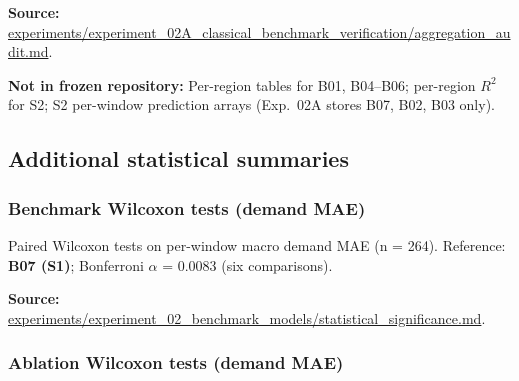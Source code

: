 \textbf{Source:} \url{experiments/experiment_02A_classical_benchmark_verification/aggregation_audit.md}.

\textbf{Not in frozen repository:} Per-region tables for B01, B04--B06; per-region $R^2$ for S2; S2 per-window prediction arrays (Exp.~02A stores B07, B02, B03 only).


\subsection{Additional statistical summaries}\label{subsection:additional_statistical_summaries}

\subsubsection{Benchmark Wilcoxon tests (demand MAE)}\label{subsubsection:benchmark_wilcoxon_tests_demand_mae}

Paired Wilcoxon tests \cite{Wilcoxon1945SignedRank} on per-window macro demand MAE (n = 264). Reference: \textbf{B07 (S1)}; Bonferroni \cite{Dunn1961Bonferroni} $\alpha$ = 0.0083 (six comparisons).

\begin{center}
\scriptsize
{}
\end{center}

\textbf{Source:} \url{experiments/experiment_02_benchmark_models/statistical_significance.md}.

\subsubsection{Ablation Wilcoxon tests (demand MAE)}\label{subsubsection:ablation_wilcoxon_tests_demand_mae}

